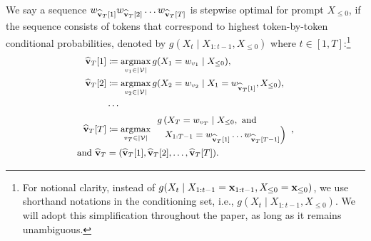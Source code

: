 \begin{definition}\label{def:stepwise_sequence}
    We say a sequence $w_{\widehat{\mathbf{v}}_T[1]} w_{\widehat{\mathbf{v}}_T[2]} \ldots w_{\widehat{\mathbf{v}}_T[T]}$ is stepwise optimal for prompt $X_{\leq 0}$, if the sequence consists of tokens that correspond to highest token-by-token conditional probabilities, denoted by $g(X_{t} \mid X_{1:t-1}, X_{\leq 0})$ where $t \in [1, T]$:\footnote{
    For notional clarity, instead of $g(X_{t} \mid X_{1:t-1}=\mathbf{x}_{1:t-1}, X_{\leq 0}=\mathbf{x}_{\leq 0})$, we use shorthand notations in the conditioning set, i.e., $g(X_{t} \mid X_{1:t-1}, X_{\leq 0})$.
    We will adopt this simplification throughout the paper, as long as it remains unambiguous.}
    \begin{equation}
        \small
        \begin{split}
            \widehat{\mathbf{v}}_T[1]          & \coloneqq \operatorname*{argmax}_{v_1 \in \lvert \mathcal{V} \rvert} g(X_1 = w_{v_1} \mid X_{\leq 0}),                                \\
            \widehat{\mathbf{v}}_T[2]          & \coloneqq \operatorname*{argmax}_{v_2 \in \lvert \mathcal{V} \rvert} g(X_2 = w_{v_2} \mid X_1 = w_{\widehat{\mathbf{v}}_T[1]}, X_{\leq 0}), \\
                                         & \cdots                                                                                                           \\
            \widehat{\mathbf{v}}_T[T]          & \coloneqq \operatorname*{argmax}_{v_T \in \lvert \mathcal{V} \rvert}
            \begin{array}{l}
                g\left(X_T = w_{v_T} \mid X_{\leq 0}, \text{ and } \right. \\
                ~~ \left. X_{1:T - 1} = w_{\widehat{\mathbf{v}}_T[1]} \ldots w_{\widehat{\mathbf{v}}_T[T - 1]}\right)
            \end{array},    \\
            \text{and } \widehat{\mathbf{v}}_T & = (\widehat{\mathbf{v}}_T[1], \widehat{\mathbf{v}}_T[2], \ldots, \widehat{\mathbf{v}}_T[T]).
        \end{split}
    \end{equation}
\end{definition}


